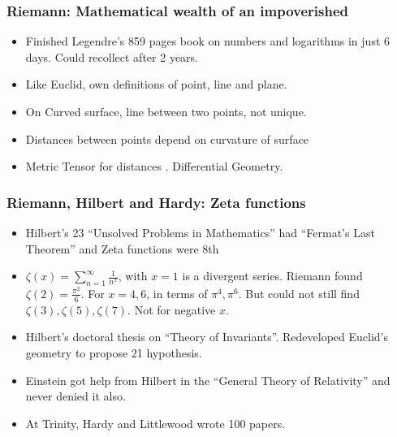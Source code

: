 \begin{frame}[fragile]
\frametitle{Riemann: Mathematical wealth of an impoverished}
\begin{itemize}[label=\textbullet,noitemsep,nolistsep]
\item Finished Legendre's 859 pages book on numbers and logarithms in just 6 days. Could recollect after 2 years.
\item Like Euclid, own definitions of point, line and plane.
\item On Curved surface, line between two points, not unique.
\item Distances between points depend on curvature of surface
\item Metric Tensor for distances . Differential Geometry. 
\end{itemize}
\end{frame}


\begin{frame}[fragile]
\frametitle{Riemann, Hilbert and Hardy: Zeta functions}
\begin{itemize}[label=\textbullet,noitemsep,nolistsep]
\item Hilbert's 23 ``Unsolved Problems in Mathematics'' had ``Fermat's Last Theorem'' and Zeta functions were 8th
\item $\zeta(x) = \sum \limits_{n = 1}^{\infty} \frac{1}{n^x}$, with $x=1$ is a divergent series. Riemann found $\zeta (2) = \frac{\pi^2}{6}$. For $x=4,6$, in terms of $\pi^4, \pi^6$. But could not still find $\zeta (3),\zeta (5),\zeta (7)$. Not for negative $x$.
\item Hilbert's doctoral thesis on ``Theory of Invariants''. Redeveloped Euclid's geometry to propose 21 hypothesis. 
\item Einstein got help from Hilbert in the ``General Theory of Relativity'' and never denied it also.
\item At Trinity, Hardy and Littlewood wrote 100 papers.
\end{itemize}
\end{frame}


